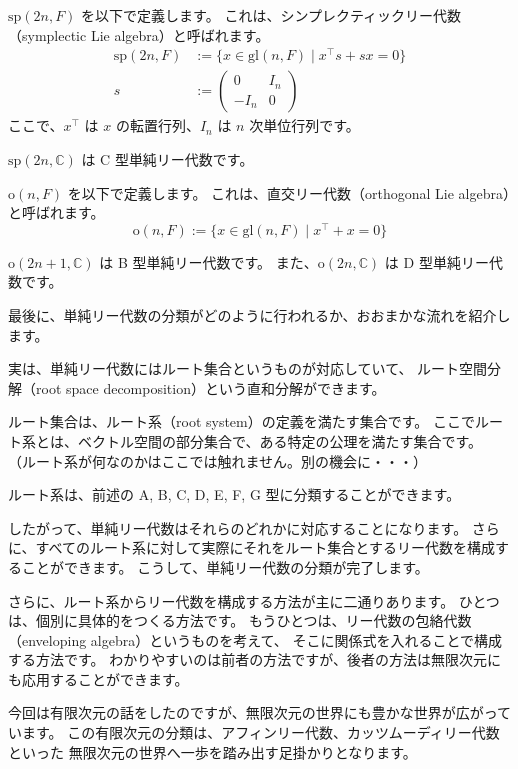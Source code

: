 \documentclass{ltjsarticle}
\begin{document}
\begin{example}[C型単純リー代数]
    $\mathrm{sp}(2n,F)$ を以下で定義します。
    これは、シンプレクティックリー代数（symplectic Lie algebra）と呼ばれます。
    \begin{align*}
        \mathrm{sp}(2n,F) & := \{x \in \mathrm{gl}(n,F) \mid x^{\intercal}s + sx = 0\} \\
        s                 & := \begin{pmatrix}
            0     & I_n \\
            - I_n & 0
        \end{pmatrix}
    \end{align*}
    ここで、$x^{\intercal}$ は $x$ の転置行列、$I_n$ は $n$ 次単位行列です。

    $\mathrm{sp}(2n,\mathbb{C})$ は C 型単純リー代数です。
\end{example}

\begin{example}[B型およびD型単純リー代数]
    $\mathrm{o}(n,F)$ を以下で定義します。
    これは、直交リー代数（orthogonal Lie algebra）と呼ばれます。
    \[
        \mathrm{o}(n,F) := \{x \in \mathrm{gl}(n,F) \mid  x^{\intercal} + x = 0\}
    \]

    $\mathrm{o}(2n+1,\mathbb{C})$ は B 型単純リー代数です。
    また、$\mathrm{o}(2n,\mathbb{C})$ は D 型単純リー代数です。
\end{example}

最後に、単純リー代数の分類がどのように行われるか、おおまかな流れを紹介します。

実は、単純リー代数にはルート集合というものが対応していて、
ルート空間分解（root space decomposition）という直和分解ができます。

ルート集合は、ルート系（root system）の定義を満たす集合です。
ここでルート系とは、ベクトル空間の部分集合で、ある特定の公理を満たす集合です。
（ルート系が何なのかはここでは触れません。別の機会に・・・）

ルート系は、前述の A, B, C, D, E, F, G 型に分類することができます。

したがって、単純リー代数はそれらのどれかに対応することになります。
さらに、すべてのルート系に対して実際にそれをルート集合とするリー代数を構成することができます。
こうして、単純リー代数の分類が完了します。

さらに、ルート系からリー代数を構成する方法が主に二通りあります。
ひとつは、個別に具体的をつくる方法です。
もうひとつは、リー代数の包絡代数（enveloping algebra）というものを考えて、
そこに関係式を入れることで構成する方法です。
わかりやすいのは前者の方法ですが、後者の方法は無限次元にも応用することができます。

今回は有限次元の話をしたのですが、無限次元の世界にも豊かな世界が広がっています。
この有限次元の分類は、アフィンリー代数、カッツムーディリー代数といった
無限次元の世界へ一歩を踏み出す足掛かりとなります。
\end{document}
